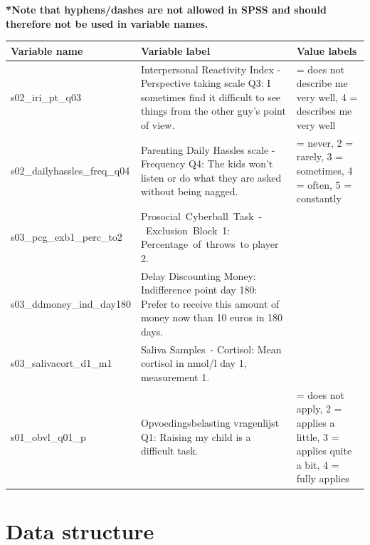 \documentclass[
  letterpaper,
  DIV=11,
  numbers=noendperiod]{scrreprt}
\begin{document}
\begin{tcolorbox}
\textbf{*Note that hyphens/dashes are not allowed in SPSS and should
therefore not be used in variable names.}

\label{naming-convention-table-3}
\begin{longtable}[]{@{}
  >{\raggedright\arraybackslash}p{}
  >{\raggedright\arraybackslash}p{}
  >{\raggedright\arraybackslash}p{}@{}}
\toprule\noalign{}
\begin{minipage}[b]{\linewidth}\raggedright
Variable name
\end{minipage} & \begin{minipage}[b]{\linewidth}\raggedright
Variable label
\end{minipage} & \begin{minipage}[b]{\linewidth}\raggedright
Value labels
\end{minipage} \\
\midrule\noalign{}
\endhead
\bottomrule\noalign{}
\endlastfoot
s02\_iri\_pt\_q03 & Interpersonal Reactivity Index - Perspective taking
scale Q3: I sometimes find it difficult to see things from the other
guy's point of view. & 0 = does not describe me very well, 4 = describes
me very well \\
s02\_dailyhassles\_freq\_q04 & Parenting Daily Hassles scale - Frequency
Q4: The kids won't listen or do what they are asked without being
nagged. & 1 = never, 2 = rarely, 3 = sometimes, 4 = often, 5 =
constantly \\
s03\_pcg\_exb1\_perc\_to2 &
Prosocial~Cyberball~Task~-~Exclusion~Block~1: Percentage~of~throws~to
player 2. & \\
s03\_ddmoney\_ind\_day180 & Delay Discounting Money: Indifference point
day 180: Prefer to receive this amount of money now than 10 euros in 180
days. & \\
s03\_salivacort\_d1\_m1 & Saliva Samples~- Cortisol: Mean cortisol in
nmol/l day 1, measurement 1. & \\
s01\_obvl\_q01\_p & Opvoedingsbelasting vragenlijst Q1: Raising my child
is a difficult task. & 1 = does not apply, 2 = applies a little, 3 =
applies quite a bit, 4 = fully applies \\
\end{longtable}

\end{tcolorbox}

\chapter{Data structure}\label{data-structure}
\end{document}
